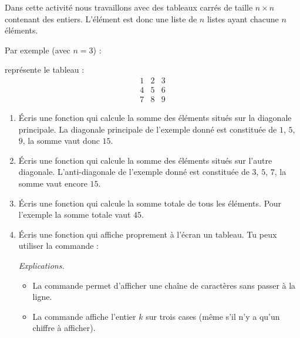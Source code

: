 \documentclass[11pt,class=report,crop=false]{standalone}
\begin{document}

\begin{activite}[Tableau]


Dans cette activité nous travaillons avec des tableaux carrés de taille $n \times n$ contenant des entiers.
L'élément  est donc une liste de $n$ listes ayant chacune $n$ éléments.

Par exemple (avec $n=3$) : \\
\centerline{}
représente le tableau :
$$\begin{array}{ccc}1&2&3\\4&5&6\\7&8&9\end{array}$$

\begin{enumerate}
  \item Écris une fonction  qui calcule la somme des éléments situés sur la diagonale principale.
  La diagonale principale de l'exemple donné est constituée de $1$, $5$, $9$, la somme vaut donc $15$.
  
  \item Écris une fonction  qui calcule la somme des éléments situés sur l'autre diagonale.
  L'anti-diagonale de l'exemple donné est constituée de $3$, $5$, $7$, la somme vaut encore $15$.
  
  \item Écris une fonction  qui calcule la somme totale de tous les éléments. Pour l'exemple la somme totale vaut $45$.
  
  \item  Écris une fonction  qui affiche proprement à l'écran un tableau. Tu peux utiliser la commande :
  
\centerline{}  

\emph{Explications.}
\begin{itemize}
  \item La commande  permet d'afficher une chaîne de caractères sans passer à la ligne.
  
  \item La commande  affiche l'entier $k$ sur trois cases (même s'il n'y a qu'un chiffre à afficher).
\end{itemize}  
\end{enumerate}

\end{activite}
\end{document}
